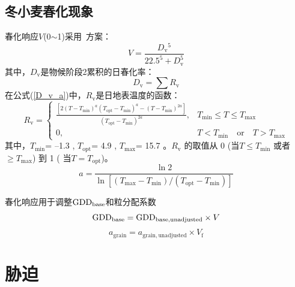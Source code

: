 \subsection{冬小麦春化现象}
春化响应$V$(0$\sim$1)采用~\citet{streck2003incorporating}方案：
\begin{equation}
  V=\frac{D_{\mathrm{v}}{ }^{5}}{22.5^{5}+D_{\mathrm{v}}^{5}}
\end{equation}
其中，$D_{\mathrm {v}} $是物候阶段2累积的日春化率：
\begin{equation}\label{D_v_a}
  D_{\mathrm{v}}=\sum R_{\mathrm{v}}
\end{equation}
在公式(\ref{D_v_a})中，$R_{\mathrm{v}}$是日地表温度的函数：
\begin{equation}
  R_{\mathrm{v}} = \begin{cases}
    \frac{\left[2\left(T-T_{\mathrm{min}}\right)^{a}\left(T_{\mathrm{opt}}-T_{\mathrm{min}}\right)^{a} - \left(T-T_{\mathrm{min}}\right)^{2a}\right]}{\left(T_{\mathrm{opt}}-T_{\mathrm{min}}\right)^{2a}}, &T_{\mathrm{min}} \leqslant T \leqslant T_{\mathrm{max}} \\
    0,  &T<T_{\mathrm{min}} \quad  \text{or} \quad T>T_{\mathrm{max}}
  \end{cases}
\end{equation}
其中，$T_{\mathrm{min}}$= –1.3 \textcelsius, $T_{\mathrm{opt}}$= 4.9 \textcelsius, $T_{\mathrm{max}}$= 15.7 \textcelsius。$ R_{\mathrm {v}} $ 的取值从 0 (当$ T\leqslant T_{\mathrm{min}}$ 或者 $ \geqslant  T_{\mathrm{max}}$) 到 1 ( 当$T=T_{\mathrm{opt}}$)。
\begin{equation}
  a=\frac{\ln 2}{\ln \left[\left(T_{\max }-T_{\min }\right) /\left(T_{\mathrm{o p t}}-T_{\min }\right)\right]}
\end{equation}

春化响应用于调整${\rm GDD}_{\mathrm{base}}$和粒分配系数
\begin{equation}
  {\rm GDD}_{\mathrm{base}}={\rm GDD}_{\mathrm{b a s e,  { unadjusted }}} \times V
\end{equation}
\begin{equation}
  a_{\mathrm{ {grain }}}=a_{\mathrm{ {grain,unadjusted }}} \times V_{\mathrm{f}}
\end{equation}


\section{胁迫}
